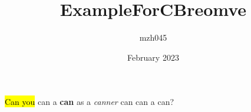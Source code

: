 \documentclass{article}
\title{ExampleForCBreomve}
\author{mzh045 }
\date{February 2023}
\newcommand{\revise}[1]{{\color{blue}#1}}
\begin{document}
\maketitle

\hl{Can you} \revise{can a \textbf{can} as a \emph{canner} can} can a can?
\end{document}
